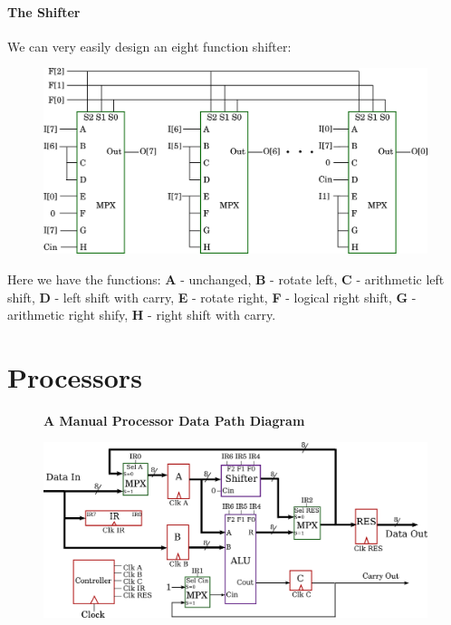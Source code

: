 \documentclass[twocolumn,english]{article}
\begin{document}
\paragraph{The Shifter}

We can very easily design an eight function shifter:

\begin{figure}[H]
\noindent \centering{}\includegraphics[width=0.3\paperwidth]{img/shifter}
\end{figure}


Here we have the functions: \textbf{A} - unchanged, \textbf{B} - rotate
left, \textbf{C} - arithmetic left shift, \textbf{D} - left shift
with carry, \textbf{E} - rotate right, \textbf{F} - logical right
shift, \textbf{G} - arithmetic right shify, \textbf{H} - right shift
with carry.


\section{Processors}

\begin{figure}[H]
\textbf{A Manual Processor Data Path Diagram}

\noindent \centering{}\includegraphics[width=0.325\paperwidth]{img/manualpdpd}
\end{figure}
\end{document}

